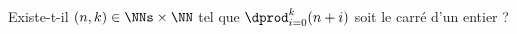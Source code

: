 Existe-t-il $(n, k) \in \NNs \times \NN$ tel que $\dprod_{i = 0}^{k} (n + i)$ soit le carré d'un entier ? 